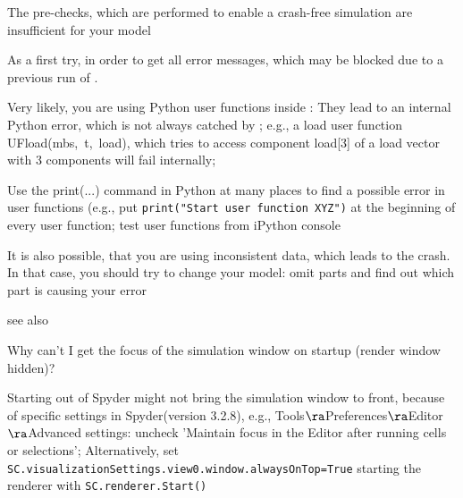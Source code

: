 %
\item[$\ra$] The pre-checks, which are performed to enable a crash-free simulation are insufficient for your model
%
\item[$\ra$] As a first try,  in order to get all error messages, which may be blocked due to a previous run of \codeName.
%
\item[$\ra$] Very likely, you are using Python user functions inside \codeName: They lead to an internal Python error, which is not always catched by \codeName; e.g., a load user function UFload(mbs,~t,~load), which tries to access component load[3] of a load vector with 3 components will fail internally;
%
\item[$\ra$] Use the print(...) command in Python at many places to find a possible error in user functions (e.g., put \texttt{print("Start user function XYZ")} at the beginning of every user function; test user functions from iPython console
%
\item[$\ra$] It is also possible, that you are using inconsistent data, which leads to the crash. In that case, you should try to change your model: omit parts and find out which part is causing your error
%
\item[$\ra$] see also 
\ei

\item Why can't I get the focus of the simulation window on startup (render window hidden)?
\bi
\item[$\ra$] Starting \codeName out of Spyder might not bring the simulation window to front, because of specific settings in Spyder(version 3.2.8), e.g., Tools$\ra$Preferences$\ra$Editor$\ra$Advanced settings: uncheck 'Maintain focus in the Editor after running cells or selections'; Alternatively, set \texttt{SC.visualizationSettings.view0.window.alwaysOnTop=True}  starting the renderer with \texttt{SC.renderer.Start()}
\ei
%
\en


